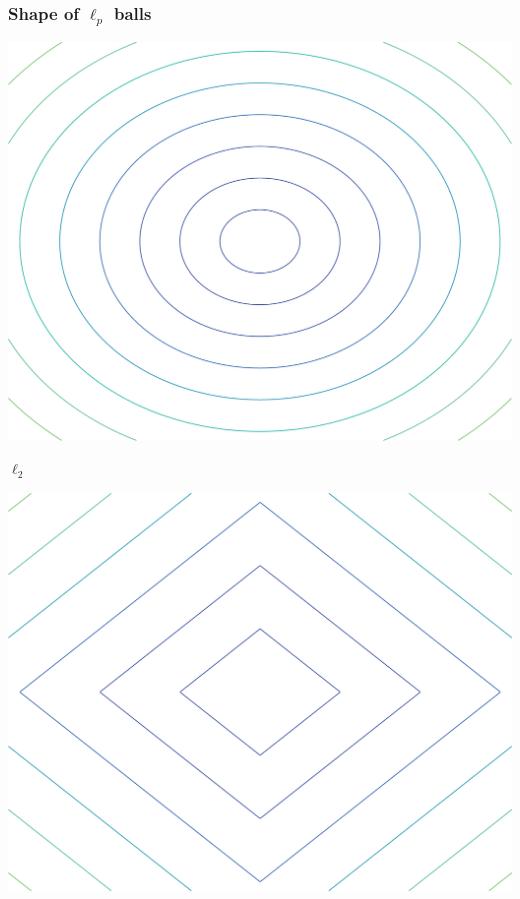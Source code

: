 \documentclass[aspectratio=169]{beamer}
\begin{document}
		\begin{frame}
		\frametitle{Shape of $\ell_p$ balls}

		\begin{center}
		
		\begin{minipage}{.3\textwidth}
		\begin{center}
		\includegraphics[width=\textwidth]{img/norm2}
		
		$\ell_2$
		\end{center}
		\end{minipage}\hfill
		\begin{minipage}{.3\textwidth}
		\begin{center}
		\includegraphics[width=\textwidth]{img/norm1}
		

\end{center}
\end{minipage}
\end{center}
\end{frame}
\end{document}
